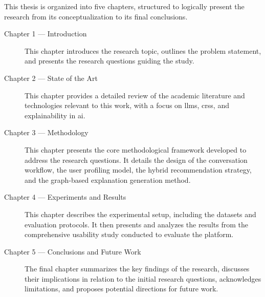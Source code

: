 This thesis is organized into five chapters, structured to logically present the research from its conceptualization to its final conclusions.

\begin{description}
    \item[Chapter 1 --- Introduction] This chapter introduces the research topic, outlines the problem statement, and presents the research questions guiding the study.
    \item[Chapter 2 --- State of the Art] This chapter provides a detailed review of the academic literature and technologies relevant to this work, with a focus on \acp{llm}, \acp{crs}, and explainability in \ac{ai}.
    \item[Chapter 3 --- Methodology] This chapter presents the core methodological framework developed to address the research questions. It details the design of the conversation workflow, the user profiling model, the hybrid recommendation strategy, and the graph-based explanation generation method.
    \item[Chapter 4 --- Experiments and Results] This chapter describes the experimental setup, including the datasets and evaluation protocols. It then presents and analyzes the results from the comprehensive usability study conducted to evaluate the platform.
    \item[Chapter 5 --- Conclusions and Future Work] The final chapter summarizes the key findings of the research, discusses their implications in relation to the initial research questions, acknowledges limitations, and proposes potential directions for future work.
\end{description}